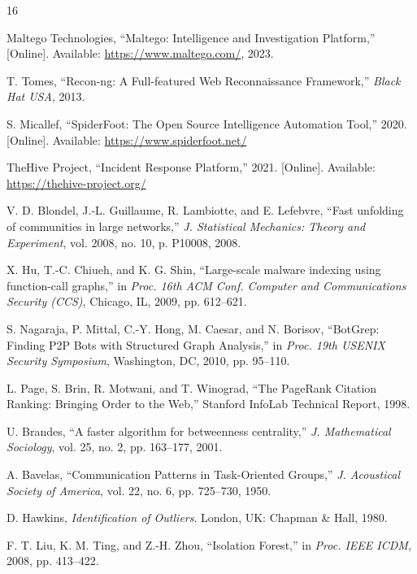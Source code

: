 \documentclass[conference]{IEEEtran}
\begin{document}

\begin{thebibliography}{16}

Maltego Technologies, ``Maltego: Intelligence and Investigation Platform,'' [Online]. Available: \url{https://www.maltego.com/}, 2023.

T. Tomes, ``Recon-ng: A Full-featured Web Reconnaissance Framework,'' \textit{Black Hat USA}, 2013.

S. Micallef, ``SpiderFoot: The Open Source Intelligence Automation Tool,'' 2020. [Online]. Available: \url{https://www.spiderfoot.net/}

TheHive Project, ``Incident Response Platform,'' 2021. [Online]. Available: \url{https://thehive-project.org/}

V. D. Blondel, J.-L. Guillaume, R. Lambiotte, and E. Lefebvre, ``Fast unfolding of communities in large networks,'' \textit{J. Statistical Mechanics: Theory and Experiment}, vol. 2008, no. 10, p. P10008, 2008.

X. Hu, T.-C. Chiueh, and K. G. Shin, ``Large-scale malware indexing using function-call graphs,'' in \textit{Proc. 16th ACM Conf. Computer and Communications Security (CCS)}, Chicago, IL, 2009, pp. 612--621.

S. Nagaraja, P. Mittal, C.-Y. Hong, M. Caesar, and N. Borisov, ``BotGrep: Finding P2P Bots with Structured Graph Analysis,'' in \textit{Proc. 19th USENIX Security Symposium}, Washington, DC, 2010, pp. 95--110.

L. Page, S. Brin, R. Motwani, and T. Winograd, ``The PageRank Citation Ranking: Bringing Order to the Web,'' Stanford InfoLab Technical Report, 1998.

U. Brandes, ``A faster algorithm for betweenness centrality,'' \textit{J. Mathematical Sociology}, vol. 25, no. 2, pp. 163--177, 2001.

A. Bavelas, ``Communication Patterns in Task-Oriented Groups,'' \textit{J. Acoustical Society of America}, vol. 22, no. 6, pp. 725--730, 1950.

D. Hawkins, \textit{Identification of Outliers}. London, UK: Chapman \& Hall, 1980.

F. T. Liu, K. M. Ting, and Z.-H. Zhou, ``Isolation Forest,'' in \textit{Proc. IEEE ICDM}, 2008, pp. 413--422.


\end{thebibliography}
\end{document}
